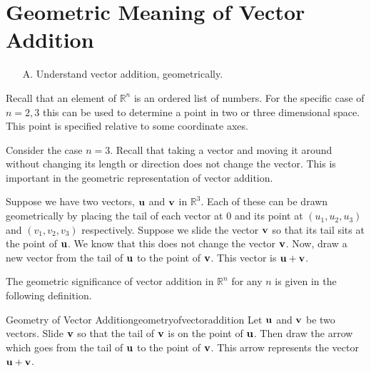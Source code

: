 \section{Geometric Meaning of Vector Addition}

\begin{outcome}

\begin{enumerate}
\item[A.] Understand vector addition, geometrically.
\end{enumerate}
\end{outcome}

Recall that an element of $\mathbb{R}^{n}$ is an ordered list of
numbers. For the specific case of $n=2,3$ this can be used to
determine a point in two or three dimensional space. This point is
specified relative to some coordinate axes.

Consider the case $n=3$. Recall that taking a vector and moving it
around without changing its length or direction does not change the
vector. This is important in the geometric representation of vector
addition.

Suppose we have two vectors, $\mathbf{u}$ and $\mathbf{v}$ in
$\mathbb{R}^{3}$. Each of these can be drawn geometrically by placing
the tail of each vector at $0$ and its point at $\left( u_{1}, u_{2},
u_{3}\right)$ and $\left( v_{1}, v_{2}, v_{3}\right) $
respectively. Suppose we slide the vector $\mathbf{v}$ so that its tail
sits at the point of $\mathbf{u}$.  We know that this does not change
the vector $\mathbf{v}$.  Now, draw a new vector from the tail of
$\mathbf{u}$ to the point of $\mathbf{v}$. This vector is
$\mathbf{u}+\mathbf{v}$.

The geometric significance of vector addition in $\mathbb{R}^n$ for any $n$ is given in
the following definition.

\begin{definition}{Geometry of Vector Addition}{geometryofvectoraddition}
Let $\mathbf{u}$ and $\mathbf{v}$ be two vectors. Slide $\mathbf{v}$ so that
the tail of $\mathbf{v}$ is on the point of $\mathbf{u}$. Then draw the
arrow which goes from the tail of $\mathbf{u}$ to the point of $\mathbf{v}$. 
This arrow represents the vector $\mathbf{u}+\mathbf{v}$.

\begin{center}
\end{center}
\end{definition}

